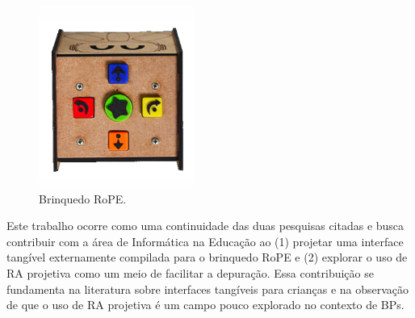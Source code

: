 \begin{figure}[!htbp]
    \centering
    \includegraphics[width=.3\linewidth,fbox]{figs/rope_top.png}
    \caption{Brinquedo RoPE.}
    \label{fig_rope}
\end{figure}


Este trabalho ocorre como uma continuidade das duas pesquisas citadas e busca contribuir com a área de Informática na Educação ao (1) projetar uma interface tangível externamente compilada para o brinquedo RoPE e (2) explorar o uso de RA projetiva como um meio de facilitar a depuração. Essa contribuição se fundamenta na literatura sobre interfaces tangíveis para crianças \cite{sapounidis_evaluating_2015, fincher_tangible_2019, plowman_interactivity_2004} e na observação de que o uso de RA projetiva é um campo pouco explorado no contexto de BPs.



